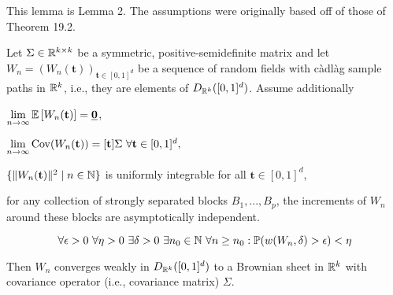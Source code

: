 This lemma is \cite{[0]BUCCHIA2017344} Lemma 2. 
The assumptions were originally based off of those of \cite{[4]billingsley1968convergence} Theorem 19.2.
\begin{lemma} \label{lemma:2}
    Let $\Sigma \in \mathbb{R}^{k \times k}$ be a symmetric, positive-semidefinite matrix and let $W_n = (W_n(\mathbf{t}))_{\mathbf{t} \in [0, 1]^d}$ be a sequence of random fields with càdlàg sample paths in $\mathbb{R}^k$, i.e., they are elements of $D_{\mathbb{R}^k}([0, 1]^d)$. Assume additionally
    \begin{aufzi}
        \item $\lim\limits_{n \to \infty} \EE{W_n(\mathbf{t})} = \usbf[0]$,
        \item $\lim\limits_{n \to \infty} \mathrm{Cov}(W_n(\mathbf{t})) = [\mathbf{t}] \Sigma \ \forall \mathbf{t} \in [0, 1]^d,$
        \item $\{ \|W_n(\mathbf{t})\|^2 \mid n \in \mathbb{N} \}$ is uniformly integrable for all $\mathbf{t} \in [0, 1]^d$,
        \item for any collection of strongly separated blocks $B_1, ..., B_p$, the increments of $W_n$ around these blocks are asymptotically independent.
        \item  
        \begin{equation} \label{lemma2:tightness assumption}
            \forall \epsilon > 0 \ \forall \eta > 0 \ \exists \delta > 0 \ \exists n_0 \in \mathbb{N} \ \forall n \geq n_0: \mathbb{P}(w(W_n, \delta) > \epsilon) < \eta
        \end{equation}
    \end{aufzi}
    Then $W_n$ converges weakly in $D_{\mathbb{R}^k}([0, 1]^d)$ to a Brownian sheet in $\mathbb{R}^k$ with covariance operator (i.e., covariance matrix) $\Sigma$.
\end{lemma}
